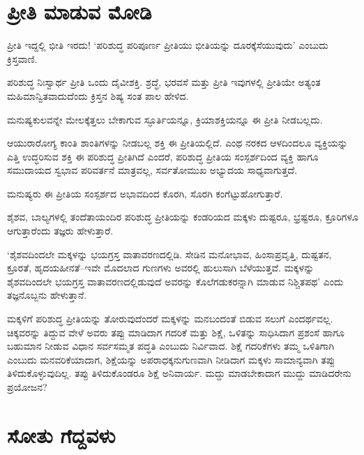 \section*{ಪ್ರೀತಿ ಮಾಡುವ ಮೋಡಿ}


ಪ್ರೀತಿ ಇದ್ದಲ್ಲಿ ಭೀತಿ ಇರದು! ‘ಪರಿಶುದ್ಧ ಪರಿಪೂರ್ಣ ಪ್ರೀತಿಯು ಭೀತಿಯನ್ನು ದೂರಕ್ಕೆಸೆಯುವುದು’ ಎಂಬುದು ಕ್ರಿಸ್ತವಾಣಿ.

\vskip 1.5pt

ಪರಿಶುದ್ಧ ನಿಃಸ್ವಾರ್ಥ ಪ್ರೀತಿ ಒಂದು ದೈವೀಶಕ್ತಿ. ಶ್ರದ್ಧೆ, ಭರವಸೆ ಮತ್ತು ಪ್ರೀತಿ ಇವುಗಳಲ್ಲಿ ಪ್ರೀತಿಯೇ ಅತ್ಯಂತ ಮಹಿಮಾನ್ವಿತವಾದುದೆಂದು ಕ್ರಿಸ್ತನ ಶಿಷ್ಯ ಸಂತ ಪಾಲ ಹೇಳಿದ.

\vskip 1.5pt

ಮನುಷ್ಯಕುಲವನ್ನೇ ಮೇಲಕ್ಕೆತ್ತಲು ಬೇಕಾಗುವ ಸ್ಫೂರ್ತಿಯನ್ನೂ, ಕ್ರಿಯಾಶಕ್ತಿಯನ್ನೂ ಈ ಪ್ರೀತಿ ನೀಡಬಲ್ಲದು.

\vskip 1.5pt

ಆಯುರಾರೋಗ್ಯ ಕಾಂತಿ ಶಾಂತಿಗಳನ್ನು ನೀಡಬಲ್ಲ ಶಕ್ತಿ ಈ ಪ್ರೀತಿಯಲ್ಲಿದೆ. ಎಂಥ ನರಕದ ಆಳದಿಂದಲೂ ವ್ಯಕ್ತಿಯನ್ನು ಎತ್ತಿ ಉದ್ಧರಿಸುವ ಶಕ್ತಿ ಈ ಪರಿಶುದ್ಧ ಪ್ರೀತಿಗಿದೆ ಎಂದರೆ, ಪರಿಶುದ್ಧ ಪ್ರೀತಿಯ ಸಂಸ್ಪರ್ಶದಿಂದ ವ್ಯಕ್ತಿ ಹಾಗೂ ಸಮುದಾಯದ ಸ್ವಭಾವ ಪರಿವರ್ತನೆ ಮಾತ್ರವಲ್ಲ, ಸರ್ವತೋಮುಖ ಅಭ್ಯುದಯ ಸಾಧ್ಯವಾಗುತ್ತದೆ.

\vskip 1.5pt

ಮನುಷ್ಯರು ಈ ಪ್ರೀತಿಯ ಸಂಸ್ಪರ್ಶದ ಅಭಾವದಿಂದ ಕೊರಗಿ, ಸೊರಗಿ ಕಂಗೆಟ್ಟು\break ಹೋಗುತ್ತಾರೆ.

\vskip 1.5pt

ಶೈಶವ, ಬಾಲ್ಯಗಳಲ್ಲಿ ತಂದೆತಾಯಂದಿರ ಪರಿಶುದ್ಧ ಪ್ರೀತಿಯನ್ನು ಕಂಡರಿಯದ ಮಕ್ಕಳು ದುಷ್ಟರೂ, ಭ್ರಷ್ಟರೂ, ಕ್ರೂರಿಗಳೂ ಆಗುತ್ತಾರೆಂದು ತಜ್ಞರು ಹೇಳುತ್ತಾರೆ.

\vskip 1.5pt

‘ಶೈಶವದಿಂದಲೇ ಮಕ್ಕಳನ್ನು ಭಯಗ್ರಸ್ತ ವಾತಾವರಣದಲ್ಲಿಡಿ. ಸೇಡಿನ ಮನೋಭಾವ, ಹಿಂಸಾಪ್ರವೃತ್ತಿ, ದುಷ್ಟತನ, ಕ್ರೂರತೆ, ಹೃದಯಹೀನತೆ–ಇವೇ ಮೊದಲಾದ ಗುಣಗಳು ಅವರಲ್ಲಿ ಹುಲುಸಾಗಿ ಬೆಳೆಯುತ್ತವೆ. ಮಕ್ಕಳನ್ನು ಶೈಶವದಿಂದಲೇ ಭಯಗ್ರಸ್ತ ವಾತಾವರಣದಲ್ಲಿಡುವುದೆ ಅವರನ್ನು ಕೊಲೆಗಡುಕರನ್ನಾಗಿ ಮಾಡುವ ನಿಶ್ಚಿತಪಥ’ ಎಂದು ತಜ್ಞನೊಬ್ಬನು ಹೇಳುತ್ತಾನೆ.

\vskip 1.5pt

ಮಕ್ಕಳಿಗೆ ಪರಿಶುದ್ಧ ಪ್ರೀತಿಯನ್ನು ತೋರುವುದೆಂದರೆ ಮಕ್ಕಳನ್ನು ಮನಬಂದಂತೆ ಬಿಡುವ ಸಲುಗೆ ಎಂದರ್ಥವಲ್ಲ. ಚಿಕ್ಕವರನ್ನು ತಿದ್ದುವ ವೇಳೆ ಅವರು ತಪ್ಪು ಮಾಡಿದಾಗ ಗದರಿಕೆ ಮತ್ತು ಶಿಕ್ಷೆ, ಒಳಿತನ್ನು ಸಾಧಿಸಿದಾಗ ಪ್ರಶಂಸೆ ಹಾಗೂ ಬಹುಮಾನ ನೀಡುವ ವಿಧಾನ ಸರ್ವಸಮ್ಮತ ಪದ್ಧತಿ ಎಂಬುದು ನಿರ್ವಿವಾದ. ಶಿಕ್ಷೆ ಗದರಿಕೆಗಳು ತಮ್ಮ ಒಳಿತಿಗಾಗಿ ಎಂಬುದು ಮನವರಿಕೆ\-ಯಾದಾಗ, ಶಿಕ್ಷೆಯನ್ನು ಅಪರಾಧಕ್ಕನುಗುಣವಾಗಿ ನೀಡಿದಾಗ ಮಕ್ಕಳು ಸಾಮಾನ್ಯವಾಗಿ ತಪ್ಪು ತಿಳಿದು\-ಕೊಳ್ಳುವುದಿಲ್ಲ. ತಪ್ಪು ತಿಳಿದುಕೊಂಡರೂ ಶಿಕ್ಷೆ ಅನಿವಾರ್ಯ. ಮದ್ದು ಮಾಡಬೇಕಾದಾಗ ಮುದ್ದು ಮಾಡಿದರೇನು ಪ್ರಯೋಜನ?

\smallskip


\section*{ಸೋತು ಗೆದ್ದವಳು}

